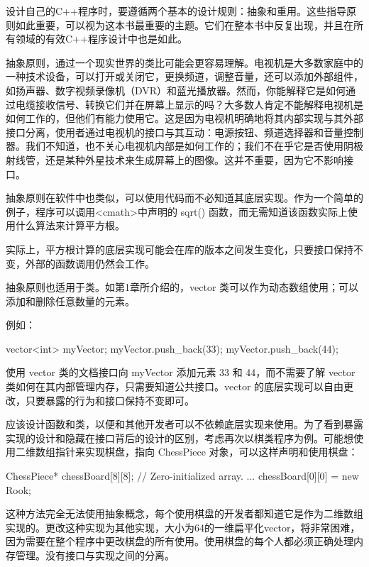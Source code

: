 
设计自己的C++程序时，要遵循两个基本的设计规则：抽象和重用。这些指导原则如此重要，可以视为这本书最重要的主题。它们在整本书中反复出现，并且在所有领域的有效C++程序设计中也是如此。


抽象原则，通过一个现实世界的类比可能会更容易理解。电视机是大多数家庭中的一种技术设备，可以打开或关闭它，更换频道，调整音量，还可以添加外部组件，如扬声器、数字视频录像机（DVR）和蓝光播放器。然而，你能解释它是如何通过电缆接收信号、转换它们并在屏幕上显示的吗？大多数人肯定不能解释电视机是如何工作的，但他们有能力使用它。这是因为电视机明确地将其内部实现与其外部接口分离，使用者通过电视机的接口与其互动：电源按钮、频道选择器和音量控制器。我们不知道，也不关心电视机内部是如何工作的；我们不在乎它是否使用阴极射线管，还是某种外星技术来生成屏幕上的图像。这并不重要，因为它不影响接口。


抽象原则在软件中也类似，可以使用代码而不必知道其底层实现。作为一个简单的例子，程序可以调用<cmath>中声明的 sqrt() 函数，而无需知道该函数实际上使用什么算法来计算平方根。

实际上，平方根计算的底层实现可能会在库的版本之间发生变化，只要接口保持不变，外部的函数调用仍然会工作。

抽象原则也适用于类。如第1章所介绍的，vector 类可以作为动态数组使用；可以添加和删除任意数量的元素。

例如：

\begin{cpp}
vector<int> myVector;
myVector.push_back(33);
myVector.push_back(44);
\end{cpp}

使用 vector 类的文档接口向 myVector 添加元素 33 和 44，而不需要了解 vector 类如何在其内部管理内存，只需要知道公共接口。vector 的底层实现可以自由更改，只要暴露的行为和接口保持不变即可。


应该设计函数和类，以便和其他开发者可以不依赖底层实现来使用。为了看到暴露实现的设计和隐藏在接口背后的设计的区别，考虑再次以棋类程序为例。可能想使用二维数组指针来实现棋盘，指向 ChessPiece 对象，可以这样声明和使用棋盘：

\begin{cpp}
ChessPiece* chessBoard[8][8]{}; // Zero-initialized array.
...
chessBoard[0][0] = new Rook{};
\end{cpp}

这种方法完全无法使用抽象概念，每个使用棋盘的开发者都知道它是作为二维数组实现的。更改这种实现为其他实现，大小为64的一维扁平化vector，将非常困难，因为需要在整个程序中更改棋盘的所有使用。使用棋盘的每个人都必须正确处理内存管理。没有接口与实现之间的分离。

